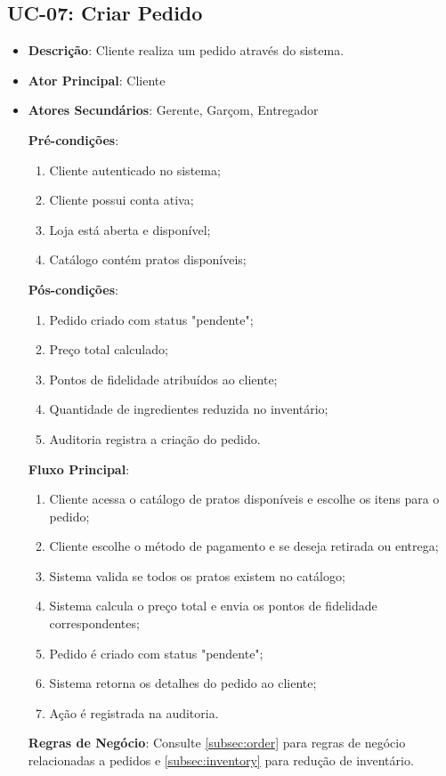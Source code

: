 \subsection{UC-07: Criar Pedido}

\begin{itemize}[topsep=1pt, itemsep=0pt]
  \item[]\textbf{Descrição}: Cliente realiza um pedido através do sistema.

  \item[]\textbf{Ator Principal}: Cliente

  \item[]\textbf{Atores Secundários}: Gerente, Garçom, Entregador

  \textbf{Pré-condições}:
  \begin{enumerate}
    \item Cliente autenticado no sistema;
    \item Cliente possui conta ativa;
    \item Loja está aberta e disponível;
    \item Catálogo contém pratos disponíveis;
  \end{enumerate}

  \textbf{Pós-condições}:
  \begin{enumerate}
    \item Pedido criado com status "pendente";
    \item Preço total calculado;
    \item Pontos de fidelidade atribuídos ao cliente;
    \item Quantidade de ingredientes reduzida no inventário;
    \item Auditoria registra a criação do pedido.
  \end{enumerate}

  \textbf{Fluxo Principal}:
  \begin{enumerate}
    \item Cliente acessa o catálogo de pratos disponíveis e escolhe os itens para o pedido;
    \item Cliente escolhe o método de pagamento e se deseja retirada ou entrega;
    \item Sistema valida se todos os pratos existem no catálogo;
    \item Sistema calcula o preço total e envia os pontos de fidelidade correspondentes;
    \item Pedido é criado com status "pendente";
    \item Sistema retorna os detalhes do pedido ao cliente;
    \item Ação é registrada na auditoria.
  \end{enumerate}

  \textbf{Regras de Negócio}:
  Consulte \ref{subsec:order} para regras de negócio relacionadas a pedidos e \ref{subsec:inventory} para redução de inventário.

\end{itemize}

